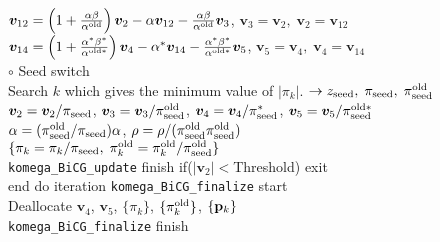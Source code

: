\documentclass[12pt,titlepage]{article}
\renewenvironment{leftbar}{%
  \def\FrameCommand{\vrule width 1pt \hspace{0pt}}%
  \MakeFramed {\advance\hsize-\width \FrameRestore}}%
 {\endMakeFramed}
\begin{document}
\begin{leftbar}
  ${\boldsymbol v}_{1 2} = \left( 1 + \frac{\alpha \beta}{\alpha^{\rm old}} \right) {\boldsymbol v}_2
  - \alpha {\boldsymbol v}_{1 2} - \frac{\alpha \beta}{\alpha^{\rm old}} {\boldsymbol v}_3$, 
  ${\boldsymbol v}_3 = {\boldsymbol v}_2,\;
  {\boldsymbol v}_2 = {\boldsymbol v}_{1 2}$
  \\\hspace{1.0cm}
  ${\boldsymbol v}_{1 4} = \left( 1 + \frac{\alpha^* \beta^*}{\alpha^{{\rm old} *}} \right) {\boldsymbol v}_4
  - \alpha^* {\boldsymbol v}_{1 4} - \frac{\alpha^* \beta^*}{\alpha^{{\rm old} *}} {\boldsymbol v}_5$, 
  ${\boldsymbol v}_5 = {\boldsymbol v}_4,\; 
  {\boldsymbol v}_4 = {\boldsymbol v}_{1 4}$
  \\\hspace{1.0cm}
  $\circ$ Seed switch
  \\\hspace{1.0cm}
  Search $k$ which gives the minimum value of $|\pi_k|$.
  $\rightarrow z_{\rm seed},\; \pi_{\rm seed},\; \pi_{\rm seed}^{\rm old} $
  \\\hspace{1.0cm}
  ${\boldsymbol v}_2 = {\boldsymbol v}_2 / \pi_{\rm seed}$,
  ${\boldsymbol v}_3 = {\boldsymbol v}_3 / \pi_{\rm seed}^{\rm old}$,
  ${\boldsymbol v}_4 = {\boldsymbol v}_4 / \pi_{\rm seed}^{*}$, 
  ${\boldsymbol v}_5 = {\boldsymbol v}_5 / \pi_{\rm seed}^{\rm old *}$
  \\\hspace{1.0cm}
  $\alpha = (\pi_{\rm seed}^{\rm old} / \pi_{\rm seed}) \alpha$,
  $\rho = \rho / (\pi_{\rm seed}^{\rm old} \pi_{\rm seed}^{\rm old})$
  \\\hspace{1.0cm}
  $\{\pi_k = \pi_k / \pi_{\rm seed},\; \pi_k^{\rm old} = \pi_k^{\rm old} / \pi_{\rm seed}^{\rm old}\}$
  \\\hspace{0.5cm}
\verb|komega_BiCG_update| finish
\end{leftbar}
\vspace{-1em}
\noindent
\hspace{0.5cm}
if($|{\boldsymbol v}_2| < $Threshold) exit
\\
end do iteration
\vspace{-1em}
\begin{leftbar}
\noindent
\verb|komega_BiCG_finalize| start
\\ \hspace{0.5cm}
Deallocate ${\boldsymbol v}_4$, ${\boldsymbol v}_5$, $\{\pi_k\}$, $\{\pi_k^{\rm old}\}$, $\{{\bf p}_k\}$
\\
\verb|komega_BiCG_finalize| finish
\end{leftbar}
\end{document}
